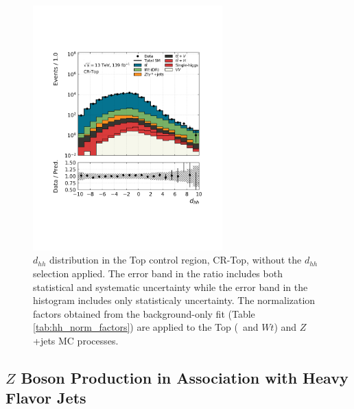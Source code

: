 \begin{figure}[!htb]
    \centering
    \includegraphics[width=0.65\textwidth]{figures/search_hh/bkg_estimate/crvr/crtop/crtoptest_NN_d_hh_fullsys}
    \caption{
        $d_{hh}$ distribution in the Top control region, CR-Top, without the $d_{hh}$ selection applied.
        The error band in the ratio includes both statistical and systematic uncertainty while
        the error band in the histogram includes only statisticaly uncertainty.
        The normalization factors obtained from the background-only fit (Table \ref{tab:hh_norm_factors}) are applied
        to the Top (\ttbar~and $Wt$) and $Z$+jets MC processes.
    }
    \label{fig:crtop_nm1_dhh}
\end{figure}

%
%

\FloatBarrier
\subsection{$Z$ Boson Production in Association with Heavy Flavor Jets}
\label{sec:cr_zhf}

